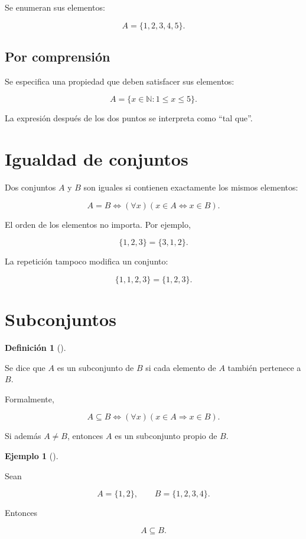 \documentclass[
  spanish,
  11pt,
  letterpaper,
  DIV=11,
  numbers=noendperiod]{scrreprt}
\theoremstyle{definition}
\newtheorem{definition}{Definición}[chapter]
\theoremstyle{plain}
\theoremstyle{definition}
\newtheorem{example}{Ejemplo}[chapter]
\theoremstyle{remark}
\begin{document}
Se enumeran sus elementos:

\[
A=\{1,2,3,4,5\}.
\]

\subsection{Por comprensión}\label{por-comprensiuxf3n}

Se especifica una propiedad que deben satisfacer sus elementos:

\[
A=\{x\in\mathbb{N}:1\leq x\leq 5\}.
\]

La expresión después de los dos puntos se interpreta como ``tal que''.

\section{Igualdad de conjuntos}\label{igualdad-de-conjuntos}

Dos conjuntos \(A\) y \(B\) son iguales si contienen exactamente los
mismos elementos:

\[
A=B
\iff
(\forall x)(x\in A\Leftrightarrow x\in B).
\]

El orden de los elementos no importa. Por ejemplo,

\[
\{1,2,3\}=\{3,1,2\}.
\]

La repetición tampoco modifica un conjunto:

\[
\{1,1,2,3\}=\{1,2,3\}.
\]

\section{Subconjuntos}\label{subconjuntos}

\begin{definition}[]\protect\hypertarget{def-subconjunto}{}\label{def-subconjunto}

Se dice que \(A\) es un subconjunto de \(B\) si cada elemento de \(A\)
también pertenece a \(B\).

\end{definition}

Formalmente,

\[
A\subseteq B
\iff
(\forall x)(x\in A\Rightarrow x\in B).
\]

Si además \(A\neq B\), entonces \(A\) es un subconjunto propio de \(B\).

\begin{example}[]\protect\hypertarget{exm-subconjunto}{}\label{exm-subconjunto}

Sean

\[
A=\{1,2\},
\qquad
B=\{1,2,3,4\}.
\]

Entonces

\[
A\subseteq B.
\]

\end{example}
\end{document}
